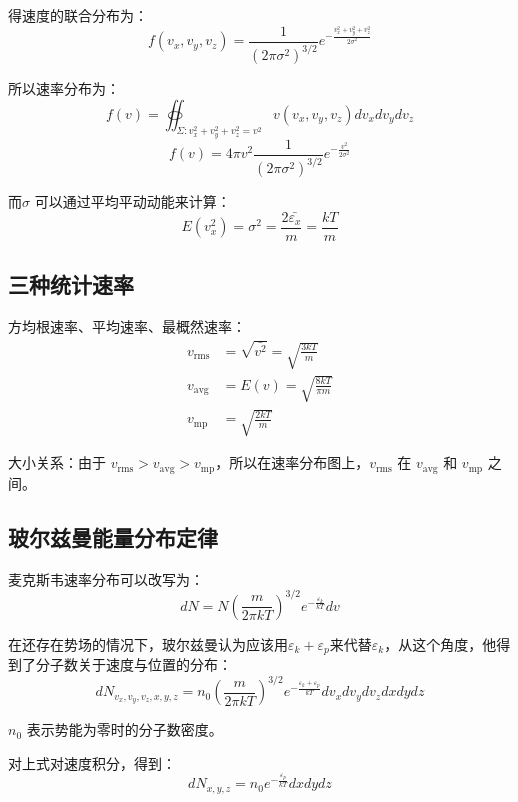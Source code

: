 \documentclass[10pt]{ctexart}
\begin{document}
得速度的联合分布为：
$$
    f(v_x,v_y,v_z) = \frac{1}{(2 \pi \sigma^2)^{3/2}} e^{-\frac{v_x^2 + v_y^2 + v_z^2}{2 \sigma^2}}
$$

所以速率分布为：
$$
    f(v) = \oiint_{\Sigma:v_x^2 + v_y^2 + v_z^2 = v^2} v(v_x,v_y,v_z) d v_x d v_y d v_z
$$
$$
    f(v) = 4\pi v^2 \frac{1}{(2 \pi \sigma^2)^{3/2}} e^{-\frac{v^2}{2 \sigma^2}}
$$

而$\sigma$ 可以通过平均平动动能来计算：
$$
    E(v_x^2) =\sigma^2= \frac{2\bar{\varepsilon_x}}{m} = \frac{kT}{m}
$$

\subsection{三种统计速率}
\label{subsec:三种统计速率}

方均根速率、平均速率、最概然速率：
\begin{align*}
    v_{\text{rms}} &= \sqrt{\bar{v^2}} = \sqrt{\frac{3kT}{m}} \\
    v_{\text{avg}} &= E(v) = \sqrt{\frac{8kT}{\pi m}} \\
    v_{\text{mp}} &= \sqrt{\frac{2kT}{m}}
\end{align*}


大小关系：由于 $v_{\text{rms}} > v_{\text{avg}} > v_{\text{mp}}$，所以在速率分布图上，$v_{\text{rms}}$ 在 $v_{\text{avg}}$ 和 $v_{\text{mp}}$ 之间。

\subsection{玻尔兹曼能量分布定律}
\label{subsec:玻尔兹曼能量分布定律}

麦克斯韦速率分布可以改写为：
$$
    d N = N \left( \frac{m}{2 \pi k T} \right)^{3/2} e^{-\frac{\varepsilon_k}{k T}} d v
$$

在还存在势场的情况下，玻尔兹曼认为应该用$\varepsilon_k + \varepsilon_p$来代替$\varepsilon_k$，从这个角度，他得到了分子数关于速度与位置的分布：
$$
    d N_{v_x,v_y,v_z,x,y,z} = n_0 \left( \frac{m}{2 \pi k T} \right)^{3/2} e^{-\frac{\varepsilon_k + \varepsilon_p}{k T}} d v_x d v_y d v_z d x d y d z
$$

$n_0$ 表示势能为零时的分子数密度。

对上式对速度积分，得到：
$$
    d N_{x,y,z} = n_0 e^{-\frac{\varepsilon_p}{k T}} d x d y d z
$$
\end{document}
